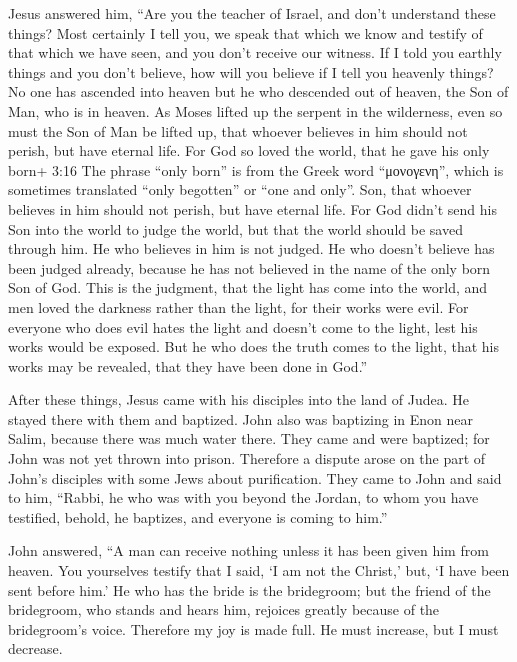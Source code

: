  Jesus answered him, ``Are you the teacher of Israel, and
don't understand these things?  Most certainly I tell you,
we speak that which we know and testify of that which we have seen, and
you don't receive our witness.  If I told you earthly
things and you don't believe, how will you believe if I tell you
heavenly things?  No one has ascended into heaven but he
who descended out of heaven, the Son of Man, who is in heaven.
 As Moses lifted up the serpent in the wilderness, even so
must the Son of Man be lifted up,  that whoever believes in
him should not perish, but have eternal life.  For God so
loved the world, that he gave his only born+ 3:16 The phrase ``only
born'' is from the Greek word ``μονογενη'', which is sometimes
translated ``only begotten'' or ``one and only''. Son, that whoever
believes in him should not perish, but have eternal life. 
For God didn't send his Son into the world to judge the world, but that
the world should be saved through him.  He who believes in
him is not judged. He who doesn't believe has been judged already,
because he has not believed in the name of the only born Son of God.
 This is the judgment, that the light has come into the
world, and men loved the darkness rather than the light, for their works
were evil.  For everyone who does evil hates the light and
doesn't come to the light, lest his works would be exposed.
 But he who does the truth comes to the light, that his
works may be revealed, that they have been done in God.''

 After these things, Jesus came with his disciples into the
land of Judea. He stayed there with them and baptized. 
John also was baptizing in Enon near Salim, because there was much water
there. They came and were baptized;  for John was not yet
thrown into prison.  Therefore a dispute arose on the part
of John's disciples with some Jews about purification. 
They came to John and said to him, ``Rabbi, he who was with you beyond
the Jordan, to whom you have testified, behold, he baptizes, and
everyone is coming to him.''

 John answered, ``A man can receive nothing unless it has
been given him from heaven.  You yourselves testify that I
said, `I am not the Christ,' but, `I have been sent before him.'
 He who has the bride is the bridegroom; but the friend of
the bridegroom, who stands and hears him, rejoices greatly because of
the bridegroom's voice. Therefore my joy is made full.  He
must increase, but I must decrease.

